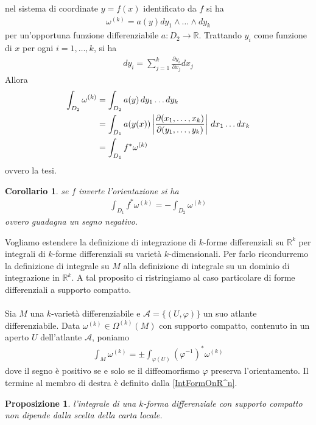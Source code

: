 \documentclass[twoside, 11pt]{amsbook}
\makeatletter
\newcommand{\0}{{(0)}}
\newcommand{\3}{{(3)}}
\theoremstyle{colonplain}
\newtheorem{prop}[thm]{Proposizione}
\newtheorem{cor}[thm]{Corollario}
\theoremstyle{colondefinition}
\theoremstyle{colonremark}
\numberwithin{equation}{chapter}
\renewcommand{\proofname}{Dimostrazione}
\renewenvironment{proof}[1][\proofname]{\par
  \pushQED{\qed}%
  \normalfont \topsep6\p@\@plus6\p@\relax
  \trivlist
  \item[\hskip\labelsep\bfseries #1:]\ignorespaces
}{%
  \popQED\endtrivlist\@endpefalse
}
\makeatother
\begin{document}
\begin{proof} nel sistema di coordinate $y = f(x)$ identificato da $f$ si ha
\begin{align}
    \omega^{(k)} = a(y)dy_1 \wedge \dots \wedge dy_k 
\end{align}
per un'opportuna funzione differenziabile $a : D_2 \longrightarrow \mathbb{R}$. Trattando $y_i$ come funzione di $x$ per ogni $i = 1, \dots, k$, si ha
\begin{align}
    dy_i = \sum_{j = 1}^k \frac{\partial y_i}{\partial x_j}dx_j 
\end{align}
Allora
\begin{align}
    \int_{D_2} \omega^{(k)} &= \int_{D_2} a(y) \, dy_1 \dots dy_k \notag \\
    &= \int_{D_1} a(y(x))\left|\frac{\partial(x_1, \dots, x_k)}{\partial(y_1, \dots, y_k)}\right| \, dx_1 \dots dx_k \notag \\
    &= \int_{D_1} f^*\omega^{(k)} 
\end{align}
ovvero la tesi.
\end{proof}
\begin{cor}
    se $f$ inverte l'orientazione si ha
\begin{align}
    \int_{D_1} f^*\omega^{(k)} = -\int_{D_2} \omega^{(k)} 
\end{align}
ovvero guadagna un segno negativo.
\end{cor}
Vogliamo estendere la definizione di integrazione di $k$-forme differenziali su $\mathbb{R}^k$ per integrali di $k$-forme differenziali su varietà $k$-dimensionali. Per farlo ricondurremo la definizione di integrale su $M$ alla definizione di integrale su un dominio di integrazione in $\mathbb{R}^k$. A tal proposito ci ristringiamo al caso particolare di forme differenziali a supporto compatto. \\ \\
Sia $M$ una $k$-varietà differenziabile e $\mathcal{A} = \{(U, \varphi)\}$ un suo atlante differenziabile. Data $\omega^{(k)} \in \Omega^{(k)}(M)$ con supporto compatto, contenuto in un aperto $U$ dell'atlante $\mathcal{A}$, poniamo
\begin{align}
    \int_M \omega^{(k)} = \pm\int_{\varphi(U)} (\varphi^{-1})^*\omega^{(k)} 
\end{align}
dove il segno è positivo se e solo se il diffeomorfismo $\varphi$ preserva l'orientamento. Il termine al membro di destra è definito dalla \eqref{IntFormOnR^n}.
\begin{prop} l'integrale di una $k$-forma differenziale con supporto compatto non dipende dalla scelta della carta locale.
\end{prop}
\end{document}
